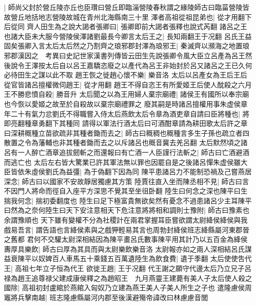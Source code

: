 |{
	師尚父封於營丘陵亦丘也臣瓚曰營丘即臨淄營陵春秋謂之緣陵師古曰臨菑營陵皆故營丘地括地志營陵故城在青州北海縣南三十里}
澤者高祖從祖昆弟也|{
	從才用翻下后從同}
齊人田生為之說大謁者張卿曰|{
	張卿即前大謁者張釋也說式芮翻}
諸呂之王也諸大臣未大服今營陵侯澤諸劉最長今卿言太后王之|{
	長知兩翻王于况翻}
呂氏王益固矣張卿入言太后太后然之乃割齊之琅邪郡封澤為琅邪王|{
	秦滅齊以瀕海之地置琅邪郡漢因之　考異曰史記世家漢書列傳皆云田生先說張卿令風大臣立呂產為呂王然後說令王澤按太后自以呂王嘉驕恣廢之以產代為呂王非始封於呂又諸呂之王已久何必待田生之謀以此不取}
趙王恢之徙趙心懷不樂|{
	樂音洛}
太后以呂產女為王后王后從官皆諸呂擅權微伺趙王|{
	從才用翻}
趙王不得自恣王有所愛姬王后使人酖殺之六月王不勝悲憤自殺|{
	勝音升}
太后聞之以為王用婦人棄宗廟禮|{
	諸侯王有國所以奉宗廟也今恢以愛姬之故至於自殺故以棄宗廟禮罪之}
廢其嗣是時諸呂擅權用事朱虚侯章年二十有氣力忿劉氏不得職嘗入侍太后燕飲太后令章為酒吏章自請曰臣將種也|{
	將即亮翻種章勇翻下其種同}
請得以軍法行酒太后曰可酒酣章請為耕田歌太后許之章曰深耕穊種立苗欲疏非其種者鋤而去之|{
	師古曰穊稠也穊種言多生子孫也疏立者四散置之令為藩輔也非其種者鋤而去之以斥諸呂也穊音冀去羌呂翻}
太后默然頃之諸呂有一人醉亡酒章追拔劒斬之而還報曰有亡酒一人臣謹行法斬之|{
	師古曰亡酒避酒而逃亡也}
太后左右皆大驚業已許其軍法無以罪也因罷自是之後諸呂憚朱虚侯雖大臣皆依朱虛侯劉氏為益彊|{
	為于偽翻下因為同}
陳平患諸呂力不能制恐禍及己嘗燕居深念|{
	師古曰以國家不安故靜居獨慮其方策}
陸賈往直入坐而陳丞相不見|{
	師古曰言不因門人將命而徑自入座平方深思不覺其至坐徂卧翻}
陸生曰何念之深也陳平曰生揣我何念|{
	揣初委翻度也}
陸生曰足下極富貴無欲矣然有憂念不過患諸呂少主耳陳平曰然為之奈何陸生曰天下安注意相天下危注意將將相和調則士豫附|{
	師古曰豫素也余謂豫順也}
天下雖有變權不分為社稷計在兩君掌握耳臣嘗欲謂太尉絳侯絳侯與我戲易吾言|{
	謂告語也言絳侯素與之戲狎輕易其言也周勃封絳侯班志絳縣屬河東郡晉之舊都}
君何不交驩太尉深相結因為陳平畫呂氏數事陳平用其計乃以五百金為絳侯夀厚具樂飲|{
	師古曰厚為其具而與太尉樂飲樂音洛}
太尉報亦如之兩人深相結呂氏謀益衰陳平以奴婢百人車馬五十乘錢五百萬遺陸生為飲食費|{
	遺于季翻}
太后使使吿代王|{
	高祖七年立子恒為代王}
欲徙王趙|{
	王于况翻}
代王謝之願守代邊太后乃立兄子呂禄為趙王追尊禄父建成康侯釋之為趙昭王　九月燕靈王建薨有美人子太后使人殺之國除|{
	高祖初封盧綰於燕綰入匈奴乃立建為燕王美人子美人所生之子也}
遣隆慮侯周竈將兵擊南越|{
	班志隆慮縣屬河内郡至後漢避殤帝諱改曰林慮慮音閭}


